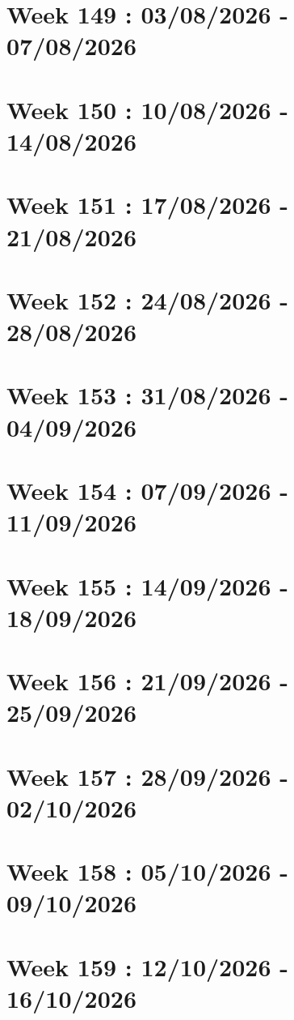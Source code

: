 \documentclass[french]{article}
\begin{document}
	\section{Week 149 : 03/08/2026 - 07/08/2026}

	\section{Week 150 : 10/08/2026 - 14/08/2026}

	\section{Week 151 : 17/08/2026 - 21/08/2026}

	\section{Week 152 : 24/08/2026 - 28/08/2026}

	\section{Week 153 : 31/08/2026 - 04/09/2026}

	\section{Week 154 : 07/09/2026 - 11/09/2026}

	\section{Week 155 : 14/09/2026 - 18/09/2026}

	\section{Week 156 : 21/09/2026 - 25/09/2026}

	\section{Week 157 : 28/09/2026 - 02/10/2026}

	\section{Week 158 : 05/10/2026 - 09/10/2026}

	\section{Week 159 : 12/10/2026 - 16/10/2026}
\end{document}

